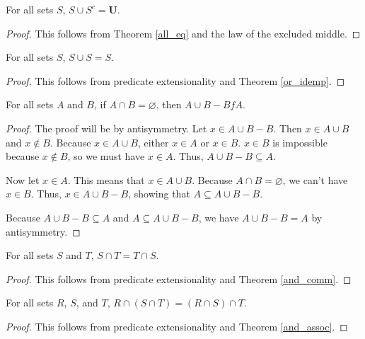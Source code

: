 \documentclass[../math.tex]{subfiles}
\begin{document}
\begin{theorem} \label{union_compl_all}
    For all sets $S$, $S \cup S^c = \bm U$.
\end{theorem}
\begin{proof}
    This follows from Theorem \ref{all_eq} and the law of the excluded middle.
\end{proof}

\begin{theorem} \label{union_idemp}
    For all sets $S$, $S \cup S = S$.
\end{theorem}
\begin{proof}
    This follows from predicate extensionality and Theorem \ref{or_idemp}.
\end{proof}

\begin{theorem} \label{union_minus}
    For all sets $A$ and $B$, if $A \cap B = \varnothing$, then $A \cup B - B f
    A$.
\end{theorem}
\begin{proof}
    The proof will be by antisymmetry.  Let $x \in A \cup B - B$.  Then $x \in A
    \cup B$ and $x \notin B$.  Because $x \in A \cup B$, either $x \in A$ or $x
    \in B$.  $x \in B$ is impossible because $x \notin B$, so we must have $x \in
    A$.  Thus, $A \cup B - B \subseteq A$.

    Now let $x \in A$.  This means that $x \in A \cup B$.  Because $A \cap B =
    \varnothing$, we can't have $x \in B$.  Thus, $x \in A \cup B - B$, showing
    that $A \subseteq A \cup B - B$.

    Because $A \cup B - B \subseteq A$ and $A \subseteq A \cup B - B$, we have
    $A \cup B - B = A$ by antisymmetry.
\end{proof}

\begin{theorem} \label{inter_comm}
    For all sets $S$ and $T$, $S \cap T = T \cap S$.
\end{theorem}
\begin{proof}
    This follows from predicate extensionality and Theorem \ref{and_comm}.
\end{proof}

\begin{theorem} \label{inter_assoc}
    For all sets $R$, $S$, and $T$, $R \cap (S \cap T) = (R \cap S) \cap T$.
\end{theorem}
\begin{proof}
    This follows from predicate extensionality and Theorem \ref{and_assoc}.
\end{proof}
\end{document}
